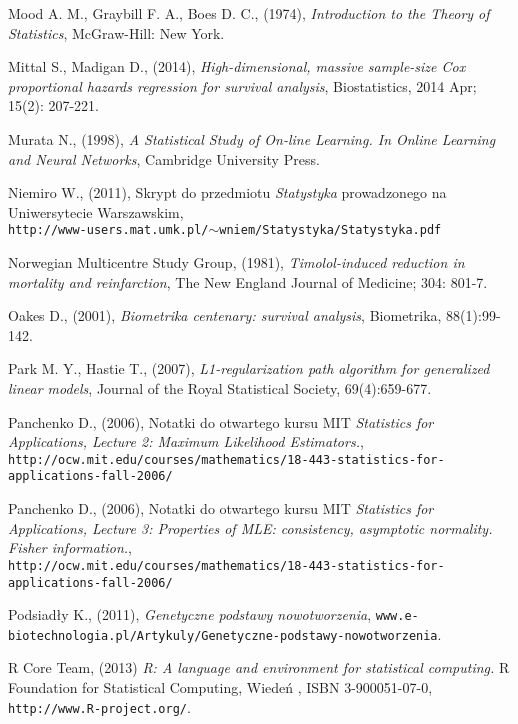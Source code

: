 \begin{thebibliography}{99}
 Mood A. M., Graybill F. A., Boes D. C., (1974), \textit{Introduction to the Theory of Statistics},
McGraw-Hill: New York.

 Mittal S., Madigan D., (2014), \textit{High-dimensional, massive sample-size Cox proportional hazards regression for survival analysis}, Biostatistics, 2014 Apr; 15(2): 207-221.

 Murata N., (1998), \textit{A Statistical Study of On-line Learning. In Online Learning
and Neural Networks}, Cambridge University Press.

 Niemiro W., (2011), Skrypt do przedmiotu \textit{Statystyka} prowadzonego na Uniwersytecie Warszawskim, \\ \texttt{http://www-users.mat.umk.pl/$\sim$wniem/Statystyka/Statystyka.pdf}

 Norwegian Multicentre Study Group, (1981), \textit{Timolol-induced reduction in
mortality and reinfarction}, The New England  Journal of Medicine; 304: 801-7.

 Oakes D., (2001), \textit{Biometrika centenary: survival analysis}, Biometrika, 88(1):99-142.


 Park M. Y., Hastie T., (2007), \textit{L1-regularization path algorithm for generalized linear models}, Journal of the Royal Statistical Society, 69(4):659-677.

 Panchenko D., (2006), Notatki do otwartego kursu MIT \textit{Statistics for Applications, Lecture 2: Maximum Likelihood Estimators.}, \\
\texttt{http://ocw.mit.edu/courses/mathematics/18-443-statistics-for-applications-fall-2006/}

 Panchenko D., (2006), Notatki do otwartego kursu MIT \textit{Statistics for Applications, Lecture 3: Properties of MLE: consistency, asymptotic normality. Fisher information.}, \\
\texttt{http://ocw.mit.edu/courses/mathematics/18-443-statistics-for-applications-fall-2006/}

 Podsiadły K., (2011), \textit{Genetyczne podstawy nowotworzenia}, \texttt{www.e-biotechnologia.pl/Artykuly/Genetyczne-podstawy-nowotworzenia}.

 R Core Team, (2013) \textit{R: A language and environment for statistical computing.} R Foundation for Statistical Computing, Wiedeń , ISBN 3-900051-07-0, \texttt{http://www.R-project.org/}.



\end{thebibliography}
